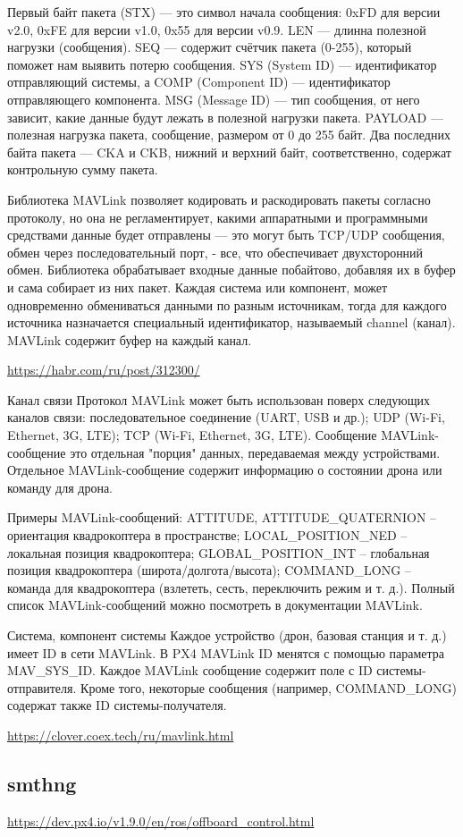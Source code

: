Первый байт пакета (STX) — это символ начала сообщения: 0xFD для версии v2.0, 0xFE для версии v1.0, 0x55 для версии v0.9. LEN — длинна полезной нагрузки (сообщения). SEQ — содержит счётчик пакета (0-255), который поможет нам выявить потерю сообщения. SYS (System ID) — идентификатор отправляющий системы, а COMP (Component ID) — идентификатор отправляющего компонента. MSG (Message ID) — тип сообщения, от него зависит, какие данные будут лежать в полезной нагрузки пакета. PAYLOAD — полезная нагрузка пакета, сообщение, размером от 0 до 255 байт. Два последних байта пакета — CKA и CKB, нижний и верхний байт, соответственно, содержат контрольную сумму пакета.

Библиотека MAVLink позволяет кодировать и раскодировать пакеты согласно протоколу, но она не регламентирует, какими аппаратными и программными средствами данные будет отправлены — это могут быть TCP/UDP сообщения, обмен через последовательный порт, - все, что обеспечивает двухсторонний обмен. Библиотека обрабатывает входные данные побайтово, добавляя их в буфер и сама собирает из них пакет. Каждая система или компонент, может одновременно обмениваться данными по разным источникам, тогда для каждого источника назначается специальный идентификатор, называемый channel (канал). MAVLink содержит буфер на каждый канал.

\url{https://habr.com/ru/post/312300/}

Канал связи
Протокол MAVLink может быть использован поверх следующих каналов связи:
последовательное соединение (UART, USB и др.);
UDP (Wi-Fi, Ethernet, 3G, LTE);
TCP (Wi-Fi, Ethernet, 3G, LTE).
Сообщение
MAVLink-сообщение это отдельная "порция" данных, передаваемая между устройствами. Отдельное MAVLink-сообщение содержит информацию о состоянии дрона или команду для дрона.

Примеры MAVLink-сообщений:
ATTITUDE, ATTITUDE\_QUATERNION – ориентация квадрокоптера в пространстве;
LOCAL\_POSITION\_NED – локальная позиция квадрокоптера;
GLOBAL\_POSITION\_INT – глобальная позиция квадрокоптера (широта/долгота/высота);
COMMAND\_LONG – команда для квадрокоптера (взлететь, сесть, переключить режим и т. д.).
Полный список MAVLink-сообщений можно посмотреть в документации MAVLink.

Система, компонент системы
Каждое устройство (дрон, базовая станция и т. д.) имеет ID в сети MAVLink. В PX4 MAVLink ID менятся с помощью параметра MAV\_SYS\_ID. Каждое MAVLink сообщение содержит поле с ID системы-отправителя. Кроме того, некоторые сообщения (например, COMMAND\_LONG) содержат также ID системы-получателя.

\url{https://clover.coex.tech/ru/mavlink.html}

\subsection{smthng}

\url{https://dev.px4.io/v1.9.0/en/ros/offboard_control.html}
